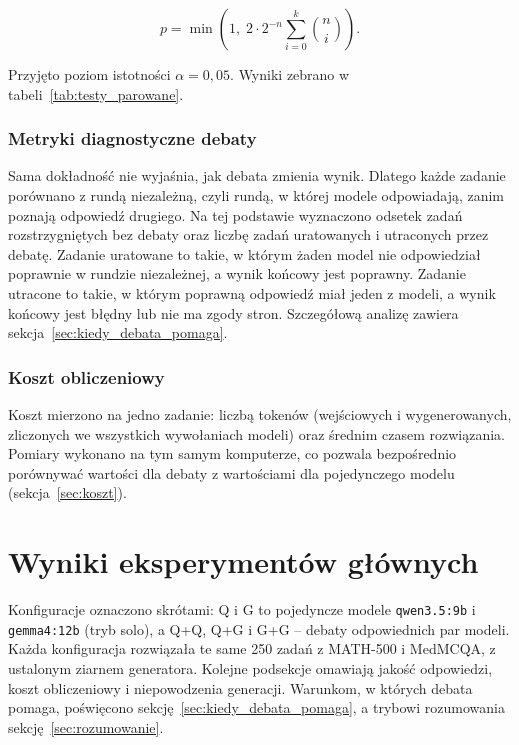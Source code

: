 \begin{equation}
    p = \min\!\left(1,\; 2 \cdot 2^{-n} \sum_{i=0}^{k} \binom{n}{i}\right).
\end{equation}

Przyjęto poziom istotności $\alpha = 0{,}05$. Wyniki zebrano w tabeli~\ref{tab:testy_parowane}.

\subsubsection{Metryki diagnostyczne debaty}

Sama dokładność nie wyjaśnia, jak debata zmienia wynik. Dlatego każde zadanie porównano z rundą niezależną, czyli rundą, w której modele odpowiadają, zanim poznają odpowiedź drugiego. Na tej podstawie wyznaczono odsetek zadań rozstrzygniętych bez debaty oraz liczbę zadań uratowanych i utraconych przez debatę. Zadanie uratowane to takie, w którym żaden model nie odpowiedział poprawnie w rundzie niezależnej, a wynik końcowy jest poprawny. Zadanie utracone to takie, w którym poprawną odpowiedź miał jeden z modeli, a wynik końcowy jest błędny lub nie ma zgody stron. Szczegółową analizę zawiera sekcja~\ref{sec:kiedy_debata_pomaga}.

\subsubsection{Koszt obliczeniowy}
\label{sec:koszt_metryka}

Koszt mierzono na jedno zadanie: liczbą tokenów (wejściowych i wygenerowanych, zliczonych we wszystkich wywołaniach modeli) oraz średnim czasem rozwiązania. Pomiary wykonano na tym samym komputerze, co pozwala bezpośrednio porównywać wartości dla debaty z wartościami dla pojedynczego modelu (sekcja~\ref{sec:koszt}).

\section{Wyniki eksperymentów głównych}

Konfiguracje oznaczono skrótami: Q i G to pojedyncze modele \texttt{qwen3.5:9b} i \texttt{gemma4:12b} (tryb solo), a Q+Q, Q+G i G+G -- debaty odpowiednich par modeli. Każda konfiguracja rozwiązała te same 250 zadań z MATH-500 i MedMCQA, z ustalonym ziarnem generatora. Kolejne podsekcje omawiają jakość odpowiedzi, koszt obliczeniowy i niepowodzenia generacji. Warunkom, w których debata pomaga, poświęcono sekcję~\ref{sec:kiedy_debata_pomaga}, a trybowi rozumowania sekcję~\ref{sec:rozumowanie}.


